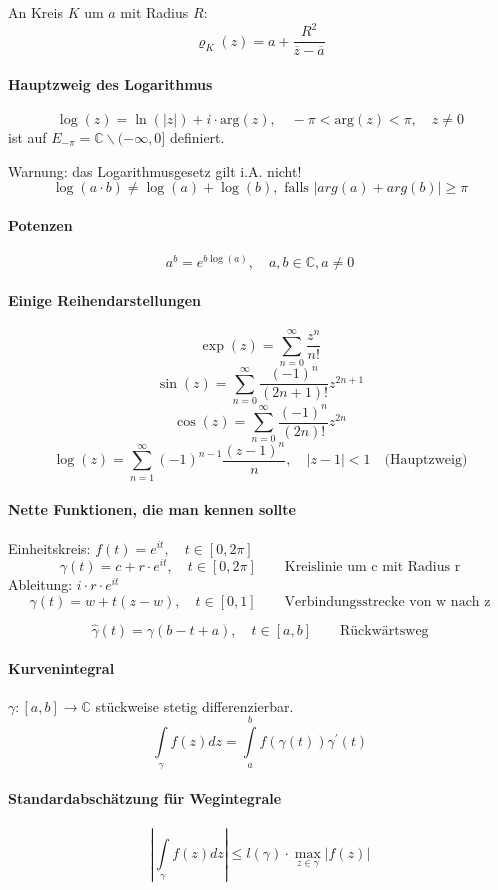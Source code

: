 \documentclass[a4paper, 10pt, DIV20, headings=small]{scrartcl}
\theoremstyle{definition}
\theoremstyle{plain}
\begin{document}
An Kreis $K$ um $a$ mit Radius $R$:
$$\varrho_K(z) = a + \frac{R^2}{\overline{z}- \overline{a}}$$

\paragraph{Hauptzweig des Logarithmus}
$$\log(z) = \ln(|z|) + i \cdot \text{arg}(z), \quad -\pi < \text{arg}(z) < \pi, \quad z \neq 0$$
ist auf $E_{- \pi} = \mathbb{C} \backslash (-\infty,0]$ definiert.

Warnung: das Logarithmusgesetz gilt i.A. nicht!
$$\log(a \cdot b) \neq \log(a) + \log(b), \text{ falls } |arg(a)+arg(b)| \geq \pi$$

\paragraph{Potenzen}
$$a^b = e^{b \log (a)}, \quad a,b \in \mathbb{C}, a \neq 0$$

\paragraph{Einige Reihendarstellungen}
$$\exp(z) = \sum\limits_{n=0}^\infty{\frac{z^n}{n!}}$$
$$\sin(z) = \sum\limits_{n=0}^\infty{\frac{(-1)^n}{(2n+1)!} z^{2n+1}}$$
$$\cos(z) = \sum\limits_{n=0}^\infty{\frac{(-1)^n}{(2n)!} z^{2n}}$$
$$\log(z) = \sum\limits_{n=1}^\infty{(-1)^{n-1} \frac{(z-1)^n}{n}}, \quad |z-1|<1 \quad \text{(Hauptzweig)}$$

\paragraph{Nette Funktionen, die man kennen sollte}
Einheitskreis: $f(t)=e^{it}, \quad t \in [0,2\pi]$
$$\gamma(t) = c + r \cdot e^{it}, \quad t \in [0,2\pi] \qquad \text{Kreislinie um c mit Radius r}$$ Ableitung: $i \cdot r \cdot e^{it}$
$$\gamma(t) =w+ t(z-w), \quad t \in [0,1] \qquad \text{Verbindungsstrecke von w nach z}$$

$$\hat{\gamma}(t) = \gamma(b-t+a), \quad t \in [a,b] \qquad \text{Rückwärtsweg}$$

\paragraph{Kurvenintegral}
$\gamma \colon [a,b] \rightarrow \mathbb{C}$ stückweise stetig differenzierbar.
$$\int\limits_{\gamma} f(z) dz = \int\limits_{a}^{b}{f(\gamma(t)) \gamma^\prime(t)}$$

\paragraph{Standardabschätzung für Wegintegrale}
$$\left|\int\limits_{\gamma} f(z) dz \right| \leq l(\gamma) \cdot \max\limits_{z \in \gamma} |f(z)|$$
\end{document}
